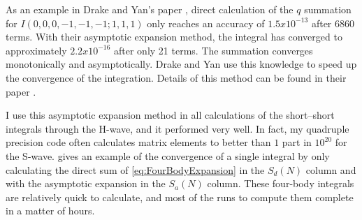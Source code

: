 \documentclass[Dissertation.tex]{subfiles}
\begin{document}
As an example in Drake and Yan's paper \cite{Drake1995}, direct calculation of the $q$ summation for $I(0,0,0,-1,-1,-1; 1,1,1)$ only reaches an accuracy of $1.5 x 10^{-13}$ after 6860 terms. With their asymptotic expansion method, the integral has converged to approximately $2.2 x 10^{-16}$ after only 21 terms. The summation converges monotonically and asymptotically. Drake and Yan use this knowledge to speed up the convergence of the integration. Details of this method can be found in their paper \cite{Drake1995}.

I use this asymptotic expansion method in all calculations of the short--short integrals through the H-wave, and it performed very well. In fact, my quadruple precision code often calculates matrix elements to better than $1$ part in $10^{20}$ for the S-wave.  gives an example of the convergence of a single integral by only calculating the direct sum of \cref{eq:FourBodyExpansion} in the $S_d(N)$ column and with the asymptotic expansion in the $S_a(N)$ column. These four-body integrals are relatively quick to calculate, and most of the runs to compute them complete in a matter of hours.
\end{document}
